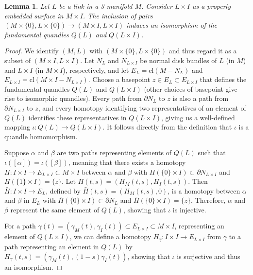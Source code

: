 \documentclass[a4paper,12pt]{amsart}
\numberwithin{equation}{section}
\theoremstyle{plain}
\newtheorem{lemma}[theorem]{Lemma}
\theoremstyle{definition}
\begin{document}
\begin{lemma} 
	\label{lemma1} 
	Let $L$ be a link in a 3-manifold $M$. 
	Consider $L\times I$ as a properly embedded surface in $M\times I$. 
	The inclusion of pairs $(M\times \{0\},L\times \{0\})\to (M\times I,L\times I)$ induces an isomorphism of the fundamental quandles $Q(L)$ and $Q(L\times I)$. 
\end{lemma}
\begin{proof}
	We identify $(M, L)$ with $(M \times \{0\}, L \times\{0\})$ and thus regard it as a subset of $(M \times I, L \times I)$.
	Let $N_L$ and $N_{L \times I}$ be normal disk bundles of $L$ (in $M$) and $L\times I$ (in $M\times I$), respectively, and
	let $E_L = \text{cl}(M - N_L)$ and $E_{L \times I} = \text{cl}(M \times I - N_{L \times I})$.
	Choose a basepoint $z \in E_L\subset E_{L \times I}$ that defines the fundamental quandles $Q(L)$ and $Q(L \times I)$
	(other choices of basepoint give rise to isomorphic quandles).
	Every path from $\partial N_L$ to $z$ is also a path from $\partial N_{L \times I}$ to $z$, and every homotopy identifying two representatives of an element of $Q(L)$ identifies these representatives in $Q(L\times I)$,
	giving us a well-defined mapping $\iota: Q(L) \to Q(L \times I)$. 
	It follows directly from the definition that $\iota$ is a quandle homomorphism.
	
	Suppose $\alpha$ and $\beta$ are two paths representing elements of $Q(L)$ such that $\iota([\alpha]) = \iota([\beta])$,
	meaning that there exists a homotopy $H\colon I \times I \to E_{L \times I} \subset M \times I$ between $\alpha$ and $\beta$ with $H(\{0\}\times I)\subset \partial N_{L\times I}$ and $H(\{1\}\times I)=\{z\}$. 
	Let $H(t,s) = (H_M(t,s), H_I(t,s))$. Then $\bar{H}: I \times I \to E_L$, defined by $\bar{H}(t,s) = (H_M(t,s), 0)$, 
	is a homotopy between $\alpha$ and $\beta$ in $E_L$ with $\bar{H}(\{0\}\times I)\subset \partial N_{L}$ and $\bar{H}(\{0\}\times I) = \{z\}$. 
	Therefore, $\alpha$ and $\beta$ represent the same element of $Q(L)$, showing that $\iota$ is injective.


	For a path $\gamma(t) = (\gamma_M(t), \gamma_I(t)) \subset E_{L\times I} \subset M \times I$, representing an element of $Q(L \times I)$,
	we can define a homotopy $H_{\gamma}:I \times I \to E_{L\times I}$ from $\gamma$ to a path representing an element in $Q(L)$ by
    $H_{\gamma}(t,s) = \left (\gamma_M(t), (1-s)\gamma_I(t)\right )$,
	showing that $\iota$ is surjective and thus an isomorphism.
\end{proof}
\end{document}
